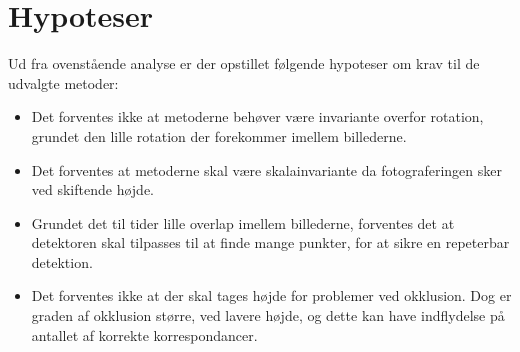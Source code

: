 \section{Hypoteser}
Ud fra ovenstående analyse er der opstillet følgende hypoteser om krav til de udvalgte metoder:
\begin{itemize}
\item{Det forventes ikke at metoderne behøver være invariante overfor rotation, grundet den lille rotation der forekommer imellem billederne. }
\item{Det forventes at metoderne skal være skalainvariante da fotograferingen sker ved skiftende højde.}
\item{ Grundet det til tider lille overlap imellem billederne, forventes det at detektoren skal tilpasses til at finde mange punkter, for at sikre en repeterbar detektion.}
\item{Det forventes ikke at der skal tages højde for problemer ved okklusion. Dog er graden af okklusion større, ved lavere højde, og dette kan have indflydelse på antallet af korrekte korrespondancer.
}
\end{itemize}